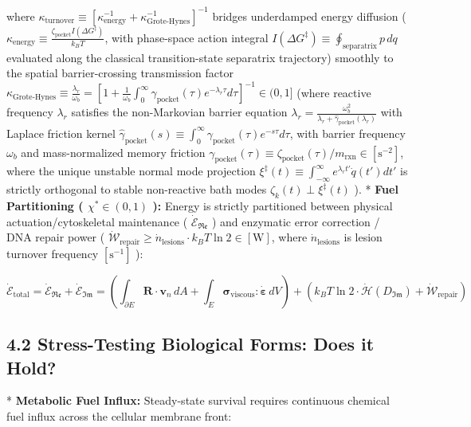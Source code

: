 \documentclass[11pt,a4paper]{article}
\theoremstyle{definition}
\theoremstyle{remark}
\begin{document}
where $\kappa_{\text{turnover}} \equiv [ \kappa_{\text{energy}}^{-1} + \kappa_{\text{Grote-Hynes}}^{-1} ]^{-1}$ bridges underdamped energy diffusion ( $\kappa_{\text{energy}} \equiv \frac{\zeta_{\text{pocket}} I(\Delta G^\ddagger)}{k_B T}$, with phase-space action integral $I(\Delta G^\ddagger) \equiv \oint_{\text{separatrix}} p \, dq$ evaluated along the classical transition-state separatrix trajectory) smoothly to the spatial barrier-crossing transmission factor $\kappa_{\text{Grote-Hynes}} \equiv \frac{\lambda_r}{\omega_b} = [ 1 + \frac{1}{\omega_b}\int_0^\infty \gamma_{\text{pocket}}(\tau) e^{-\lambda_r \tau} d\tau ]^{-1} \in (0, 1]$ (where reactive frequency $\lambda_r$ satisfies the non-Markovian barrier equation $\lambda_r = \frac{\omega_b^2}{\lambda_r + \hat{\gamma}_{\text{pocket}}(\lambda_r)}$ with Laplace friction kernel $\hat{\gamma}_{\text{pocket}}(s) \equiv \int_0^\infty \gamma_{\text{pocket}}(\tau)e^{-s\tau}d\tau$, with barrier frequency $\omega_b$ and mass-normalized memory friction $\gamma_{\text{pocket}}(\tau) \equiv \zeta_{\text{pocket}}(\tau)/m_{\text{rxn}} \in [\mathrm{s^{-2}}]$, where the unique unstable normal mode projection $\xi^{\ddagger}(t) \equiv \int_{-\infty}^\infty e^{\lambda_r t'} \dot{q}(t') dt'$ is strictly orthogonal to stable non-reactive bath modes $\zeta_k(t) \perp \xi^{\ddagger}(t)$ ).
* \textbf{Fuel Partitioning ( $\chi^* \in (0, 1)$ ):} Energy is strictly partitioned between physical actuation/cytoskeletal maintenance ( $\dot{\mathcal{E}}_{\mathfrak{Re}}$ ) and enzymatic error correction / DNA repair power ( $\dot{\mathcal{W}}_{\text{repair}} \ge \dot{n}_{\text{lesions}} \cdot k_B T \ln 2 \in [\mathrm{W}]$, where $\dot{n}_{\text{lesions}}$ is lesion turnover frequency $[\mathrm{s^{-1}}]$ ):


\begin{equation}
\dot{\mathcal{E}}_{\text{total}} = \dot{\mathcal{E}}_{\mathfrak{Re}} + \dot{\mathcal{E}}_{\mathfrak{Im}} = \left( \int_{\partial E} \mathbf{R} \cdot \mathbf{v}_n \, dA + \int_E \boldsymbol{\sigma}_{\text{viscous}} : \dot{\boldsymbol{\varepsilon}} \, dV \right) + \left( k_B T \ln 2 \cdot \dot{\mathcal{H}}(D_{\mathfrak{Im}}) + \dot{\mathcal{W}}_{\text{repair}} \right)
\end{equation}


\subsection{4.2 Stress-Testing Biological Forms: Does it Hold?}
* \textbf{Metabolic Fuel Influx:} Steady-state survival requires continuous chemical fuel influx across the cellular membrane front:
\end{document}
